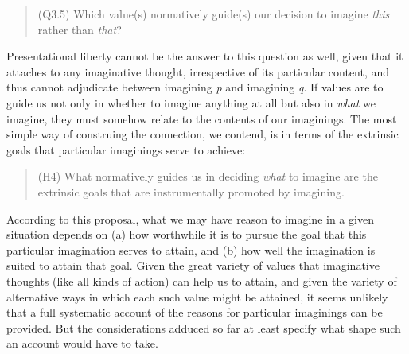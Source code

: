 \vspace{-.2cm}
\begin{quote}
(Q3.5) Which value(s) normatively guide(s) our decision to imagine \emph{this} rather than \emph{that}?
\end{quote}
\vspace{-.2cm}


\noindent Presentational liberty cannot be the answer to this question as well, given that it attaches to any imaginative thought, irrespective of its particular content, and thus cannot adjudicate between imagining \emph{p} and imagining \emph{q}. If values are to guide us not only in whether to imagine anything at all but also in \emph{what} we imagine, they must somehow relate to the contents of our imaginings. The most simple way of construing the connection, we contend, is in terms of the extrinsic goals that particular imaginings serve to achieve:

\vspace{-.2cm}
\begin{quote}
(H4) What normatively guides us in deciding \emph{what} to imagine are the extrinsic goals that are instrumentally promoted by imagining.
\end{quote}
\vspace{-.2cm}

\noindent According to this proposal, what we may have reason to imagine in a given situation depends on (a) how worthwhile it is to pursue the goal that this particular imagination serves to attain, and (b) how well the imagination is suited to attain that goal. Given the great variety of values that imaginative thoughts (like all kinds of action) can help us to attain, and given the variety of alternative ways in which each such value might be attained, it seems unlikely that a full systematic account of the reasons for particular imaginings can be provided. But the considerations adduced so far at least specify what shape such an account would have to take.




